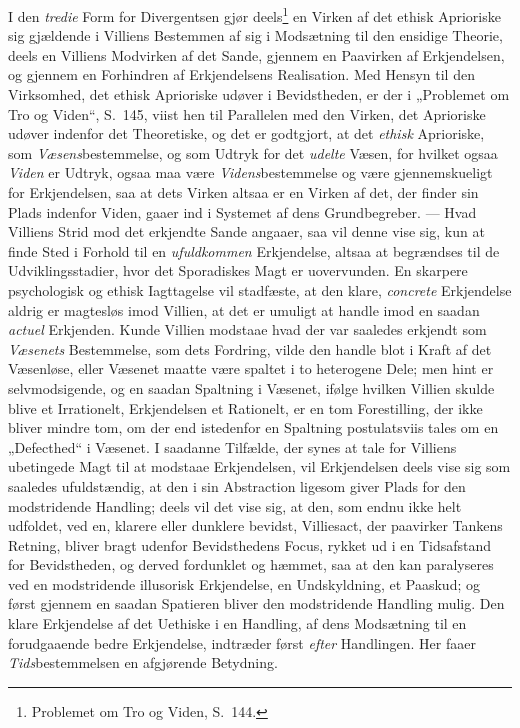 I den \emph{tredie} Form for Divergentsen gjør deels\footnote{Problemet om Tro
og Viden, S.\ 144.} en Virken af det ethisk Aprioriske sig gjældende i
Villiens Bestemmen af sig i Modsætning til den ensidige Theorie, deels en
Villiens Modvirken af det Sande, gjennem en Paavirken af Erkjendelsen, og
gjennem en Forhindren af Erkjendelsens Realisation. Med Hensyn til den
Virksomhed, det ethisk Aprioriske udøver i Bevidstheden, er der i „Problemet
om Tro og Viden“, S.\ 145, viist hen til Parallelen med den Virken, det
Aprioriske udøver indenfor det Theoretiske, og det er godtgjort, at det
\emph{ethisk} Aprioriske, som \emph{Væsens}bestemmelse, og som Udtryk for det
\emph{udelte} Væsen, for hvilket ogsaa \emph{Viden} er Udtryk, ogsaa maa være
\emph{Videns}bestemmelse og være gjennemskueligt for Erkjendelsen, saa at dets
Virken altsaa er en Virken af det, der finder sin Plads indenfor Viden, gaaer
ind i Systemet af dens Grundbegreber. --- Hvad Villiens Strid mod det
erkjendte Sande angaaer, saa vil denne vise sig, kun at finde Sted i Forhold
til en \emph{ufuldkommen} Erkjendelse, altsaa at begrændses til de
Udviklingsstadier, hvor det Sporadiskes Magt er uovervunden. En skarpere
psychologisk og ethisk Iagttagelse vil stadfæste, at den klare,
\emph{concrete} Erkjendelse aldrig er magtesløs imod Villien, at det er
umuligt at handle imod
 en saadan \emph{actuel} Erkjenden. Kunde Villien modstaae hvad der var saaledes
erkjendt som \emph{Væsenets} Bestemmelse, som dets Fordring, vilde den handle
blot i Kraft af det Væsenløse, eller Væsenet maatte være spaltet i to heterogene
Dele; men hint er selvmodsigende, og en saadan Spaltning i Væsenet, ifølge
hvilken Villien skulde blive et Irrationelt, Erkjendelsen et Rationelt, er en
tom Forestilling, der ikke bliver mindre tom, om der end istedenfor en Spaltning
postulatsviis tales om en „Defecthed“ i Væsenet. I saadanne Tilfælde, der synes
at tale for Villiens ubetingede Magt til at modstaae Erkjendelsen, vil
Erkjendelsen deels vise sig som saaledes ufuldstændig, at den i sin Abstraction
ligesom giver Plads for den modstridende Handling; deels vil det vise sig, at
den, som endnu ikke helt udfoldet, ved en, klarere eller dunklere bevidst,
Villiesact, der paavirker Tankens Retning, bliver bragt udenfor Bevidsthedens
Focus, rykket ud i en Tidsafstand for Bevidstheden, og derved fordunklet og
hæmmet, saa at den kan paralyseres ved en modstridende illusorisk Erkjendelse,
en Undskyldning, et Paaskud; og først gjennem en saadan Spatieren bliver den
modstridende Handling mulig. Den klare Erkjendelse af det Uethiske i en
Handling, af dens Modsætning til en forudgaaende bedre Erkjendelse, indtræder
først \emph{efter} Handlingen. Her faaer \emph{Tids}bestemmelsen en afgjørende
Betydning.

